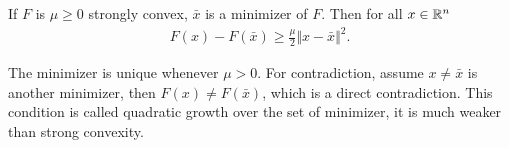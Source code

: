 \documentclass[12pt]{article}
\begin{document}
        \begin{lemma}\label{lemma:q-growth}
            If $F$ is $\mu \ge 0$ strongly convex, $\bar x$ is a minimizer of $F$. 
            Then for all $x \in \mathbb R^n$
            \begin{align*}
                F(x) - F(\bar x) \ge \frac{\mu}{2}\Vert x - \bar x\Vert^2. 
            \end{align*}
        \end{lemma}
        \begin{remark}
            The minimizer is unique whenever $\mu > 0$. 
            For contradiction, assume $x \neq \bar x$ is another minimizer, then $F(x) \neq F(\bar x)$, which is a direct contradiction. 
            This condition is called quadratic growth over the set of minimizer, it is much weaker than strong convexity. 
        \end{remark}
        
\end{document}
